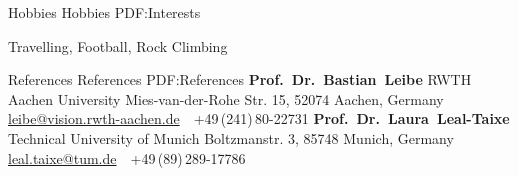 \documentclass[letterpaper,MMMyyyy,nonstopmode]{simpleresumecv}
\newcommand{\CVNote}{CV compiled on {\today}}
\begin{document}
\begin{Body}

%
%

\Section
{Hobbies}
{Hobbies}
{PDF:Interests}

\Entry
Travelling,
Football,
Rock Climbing

\Section
{References}
{References}
{PDF:References}
\BulletItem
\textbf{Prof.~Dr.~Bastian~Leibe}
\newline
RWTH Aachen University
\newline
Mies-van-der-Rohe Str. 15, 52074 Aachen, Germany
\newline
\href{mailto:leibe@vision.rwth-aachen.de}
{leibe@vision.rwth-aachen.de}
\,\SubBulletSymbol\,
+49\,(241)\,80-22731
%
\BulletItem
\textbf{Prof.~Dr.~Laura~Leal-Taixe}
\newline
Technical University of Munich
\newline
Boltzmanstr. 3, 85748 Munich, Germany
\newline
\href{mailto:leal.taixe@tum.de}
{leal.taixe@tum.de}
\,\SubBulletSymbol\,
+49\,(89)\,289-17786
\end{Body}

%
\end{document}
